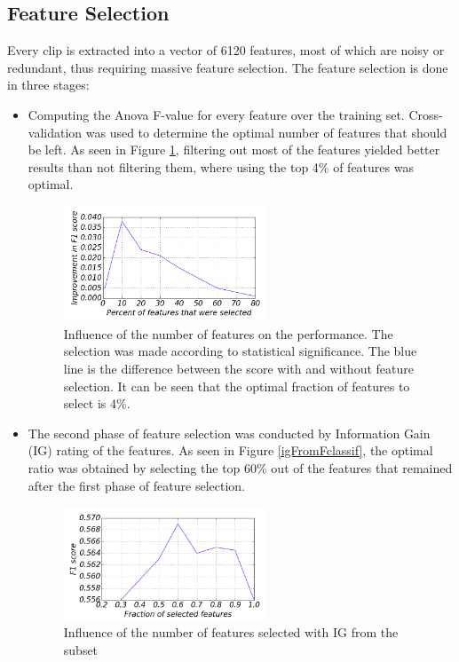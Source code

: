 \documentclass[11pt,twocolumn,varwidth=true,a4paper,fleqn]{article}
\begin{document}
\subsection{Feature Selection}
Every clip is extracted into a vector of 6120 features, most of which are noisy or redundant, thus requiring massive feature selection. The feature selection is done in three stages:
	\begin{itemize}
		\item
		Computing the Anova F-value for every feature over the training set. Cross-validation was used to determine the optimal number of features that should be
		left. As seen in Figure  \ref{selection}, filtering out most of the features yielded better          results than not filtering them, where using the top 4\% of features was optimal.
		\begin{figure}[ht!]
			\centering
			\includegraphics[width=60mm]{featureSelection.png}
			\caption{Influence of the number of features on the performance. The
			selection was made according to statistical significance.
			The blue line is the difference between the score with and without feature
			selection. It can be seen that the optimal fraction of features to select is
			4\%.}
			\label{selection}
			\end{figure}
		\item
			The second phase of feature selection was conducted by Information Gain (IG) rating of the features. As seen in Figure  \ref{igFromFclassif}, the optimal ratio was obtained by selecting the top 60\% out of the features that remained after the first
			phase of feature selection.
			 \begin{figure}[h]
				\centering
				\includegraphics[width=60mm]{igFromFclassif.png}
				\caption{Influence of the number of features selected with IG from the subset
}
\end{figure}
\end{itemize}
\end{document}
